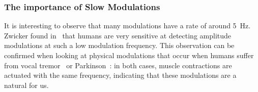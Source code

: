 \subsubsection*{The importance of Slow Modulations}

It is interesting to observe that many modulations have a rate of around 5~\si{\hertz}. 
Zwicker found in~\cite{zwicker52} that humans are very sensitive at detecting amplitude modulations at such a low modulation frequency.
This observation can be confirmed when looking at physical modulations that occur when humans suffer from vocal tremor~\cite{ramig87} or Parkinson~\cite{botzel14}: in both cases, muscle contractions are actuated with the same frequency, indicating that these modulations are a natural for us.


